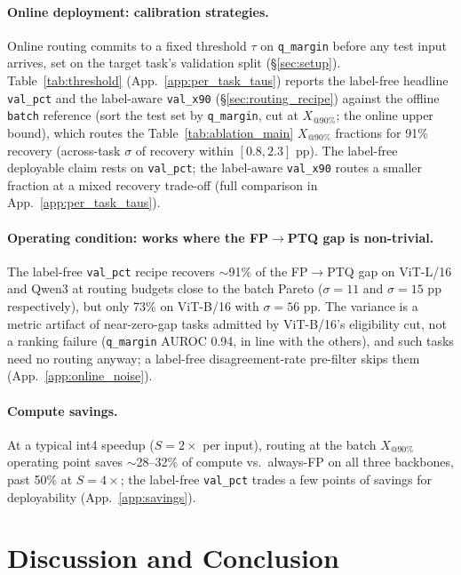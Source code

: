 \documentclass{article}
\makeatletter
\newcommand{\fp}{\textsc{FP}\xspace}
\newcommand{\ptq}{\textsc{PTQ}\xspace}
\newcommand{\xat}[1]{\ensuremath{X_{@#1\%}}}
\makeatother
\begin{document}
\paragraph{Online deployment: calibration strategies.}\label{sec:online}
Online routing commits to a fixed threshold $\tau$ on \texttt{q\_margin} before any test input arrives, set on the target task's validation split (\S\ref{sec:setup}). Table~\ref{tab:threshold} (App.~\ref{app:per_task_taus}) reports the label-free headline \texttt{val\_pct} and the label-aware \texttt{val\_x90} (\S\ref{sec:routing_recipe}) against the offline \texttt{batch} reference (sort the test set by \texttt{q\_margin}, cut at \xat{90}; the online upper bound), which routes the Table~\ref{tab:ablation_main} \xat{90} fractions for 91\% recovery (across-task $\sigma$ of recovery within $[0.8, 2.3]$ pp). The label-free deployable claim rests on \texttt{val\_pct}; the label-aware \texttt{val\_x90} routes a smaller fraction at a mixed recovery trade-off (full comparison in App.~\ref{app:per_task_taus}).

\paragraph{Operating condition: works where the \fp$\to$\ptq{} gap is non-trivial.}
The label-free \texttt{val\_pct} recipe recovers $\sim$91\% of the \fp$\to$\ptq{} gap on ViT-L/16 and Qwen3 at routing budgets close to the batch Pareto ($\sigma\!=\!11$ and $\sigma\!=\!15$ pp respectively), but only 73\% on ViT-B/16 with $\sigma\!=\!56$ pp. The variance is a metric artifact of near-zero-gap tasks admitted by ViT-B/16's eligibility cut, not a ranking failure (\texttt{q\_margin} AUROC 0.94, in line with the others), and such tasks need no routing anyway; a label-free disagreement-rate pre-filter skips them (App.~\ref{app:online_noise}).

\paragraph{Compute savings.}
At a typical int4 speedup ($S\!=\!2\times$ per input), routing at the batch \xat{90} operating point saves $\sim$28--32\% of compute vs.\ always-\fp{} on all three backbones, past 50\% at $S\!=\!4\times$; the label-free \texttt{val\_pct} trades a few points of savings for deployability (App.~\ref{app:savings}).

\section{Discussion and Conclusion}\label{sec:discussion}
\end{document}
